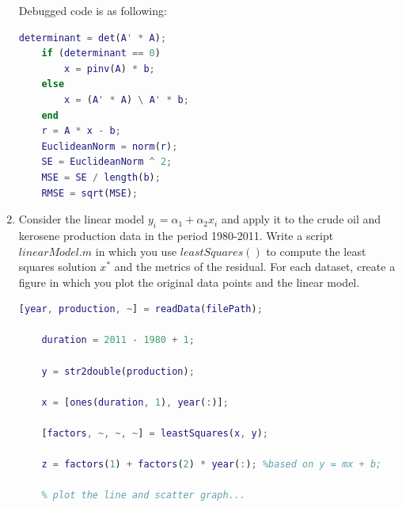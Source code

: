 \documentclass[unicode,11pt,a4paper,oneside,numbers=endperiod,openany]{scrartcl}
\begin{document}
\begin{enumerate}[label=(\alph*)]
 Debugged code is as following:
 \begin{lstlisting}[language=Matlab]
    determinant = det(A' * A);
    if (determinant == 0)
        x = pinv(A) * b;
    else
        x = (A' * A) \ A' * b;
    end
    r = A * x - b;
    EuclideanNorm = norm(r);
    SE = EuclideanNorm ^ 2;
    MSE = SE / length(b);
    RMSE = sqrt(MSE);
 \end{lstlisting}

 
 \item Consider the linear model ${y_i = \alpha_1 + \alpha_2x_i}$ and apply it to the crude oil and kerosene production data in the
period 1980-2011. Write a script ${linearModel.m}$ in which you use ${leastSquares()}$ to compute the
least squares solution ${x^*}$ and the metrics of the residual. For each dataset, create a figure in which you plot the original data points and the linear model. \\

 \begin{lstlisting}[language=Matlab]
    [year, production, ~] = readData(filePath);
    
    duration = 2011 - 1980 + 1;

    y = str2double(production);

    x = [ones(duration, 1), year(:)];

    [factors, ~, ~, ~] = leastSquares(x, y);

    z = factors(1) + factors(2) * year(:); %based on y = mx + b;
    
    % plot the line and scatter graph...
 \end{lstlisting}


\end{enumerate}
\end{document}
